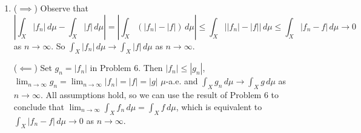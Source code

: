 \documentclass[12pt]{report}
\newcommand{\numl}[1]{\item[\large\textbf{\sffamily #1.}]}
\newcommand{\abs}[1]{\left| #1 \right|}
\newcommand{\paren}[1]{\left( #1 \right)}
\newcommand{\ra}{\rightarrow}
\newcommand{\mimp}{\(\implies\)}
\newcommand{\mimpd}{\(\impliedby\)}
\renewcommand{\d}[1]{\,d{#1}}
\begin{document}
\begin{enumerate}
    \numl{7} (\mimp) Observe that
    \[
        \abs{\int_X \abs{f_n} \d{\mu} - \int_X \abs{f} \d{\mu}} = \abs{\int_X \paren{\abs{f_n} - \abs{f}} \d{\mu}} \leq \int_X \abs{\abs{f_n} - \abs{f}} \d{\mu} \leq \int_X \abs{f_n - f}\d{\mu} \ra 0
    \]
    as \(n \ra \infty\). So \(\int_X \abs{f_n} \d{\mu} \ra \int_X \abs{f} \d{\mu}\) as \(n \ra \infty\).

    (\mimpd) Set \(g_n = \abs{f_n}\) in {\sffamily Problem 6}. Then \(\abs{f_n}\leq \abs{g_n}\), \(\lim_{n \ra \infty} g_n = \lim_{n \ra \infty} \abs{f_n} = \abs{f} = \abs{g}\) \(\mu\)-a.e. and \(\int_X g_n \d{\mu} \ra \int_X g \d{\mu}\) as \(n \ra \infty\). All assumptions hold, so we can use the result of {\sffamily Problem 6} to conclude that \(\lim_{n \ra \infty} \int_X f_n \d{\mu} = \int_X f \d{\mu}\), which is equivalent to \(\int_X \abs{f_n - f} \d{\mu} \ra 0\) as \(n \ra \infty\).

\end{enumerate}
\end{document}
